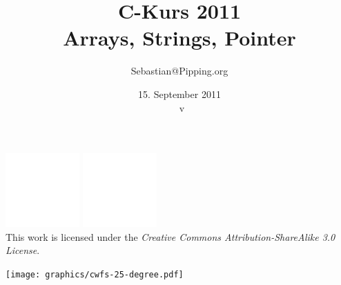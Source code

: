 \usepackage[utf8]{inputenc}
\usepackage[T1]{fontenc}
\usepackage[german]{babel} %
\usepackage{color}
\usepackage{textcomp}
\usepackage{ulem} %
\usepackage{pgf}

\title{C-Kurs 2011\\Arrays, Strings, Pointer}
\author{Sebastian@Pipping.org}
\date{15. September 2011\\{\tiny~v\vspace*{-5ex}}}


\newcommand{\CcLongnameBySa}{Attribution-ShareAlike}
\newcommand{\CcImageBy}[1]{%
	\includegraphics[scale=#1]{creative-commons/cc-by-white.pdf}%
}
\newcommand{\CcImageSa}[1]{%
	\includegraphics[scale=#1]{creative-commons/cc-sa-white.pdf}%
}
\newcommand{\CcNote}[1]{%
	This work is licensed under the \textit{Creative Commons #1 3.0 License}.%
}
\newcommand{\CcGroupBySa}[2]{%
	\CcImageBy{#1}\hspace*{#2}\CcImageSa{#1}%
}



\pgfsetendarrow{\pgfarrowtriangle{4pt}}
\newcommand{\sexyarrowrightLarge}[0]{\pgfsetlinewidth{0.4pt}\pgfline{\pgfxy(0,0.15)}{\pgfxy(0.7,0.15)}\hspace*{3.35ex}}
\newcommand{\sexyarrowrightLARGE}[0]{\pgfsetlinewidth{0.6pt}\pgfline{\pgfxy(0,0.15)}{\pgfxy(0.9,0.15)}\hspace*{3.35ex}}


\newcommand{\citesrc}[1]{\textit{#1}}
\renewcommand{\emph}[1]{\textit{#1}}



\begin{frame}
	\titlepage
	\vfill
	\begin{center}
		\CcGroupBySa{0.33}{0.95ex}\\[2.5ex]
		{\tiny\CcNote{\CcLongnameBySa}}
		\vspace*{13ex}
	\end{center}
	\vspace*{-5ex}
	\vspace*{-0.5\textheight}\hspace*{0.65\textwidth}\texttt{[image: graphics/cwfs-25-degree.pdf]}
\end{frame}



